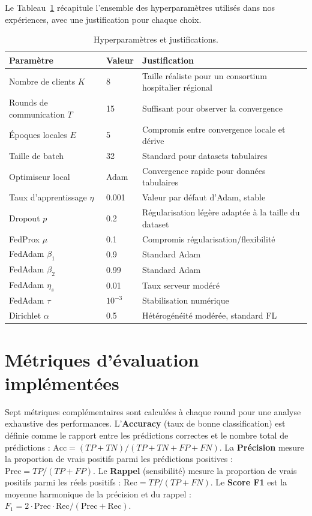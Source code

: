 \documentclass[12pt,a4paper]{report}
\begin{document}
Le Tableau~\ref{tab:hyperparams} r\'{e}capitule l'ensemble des hyperparam\`{e}tres utilis\'{e}s dans nos exp\'{e}riences, avec une justification pour chaque choix.

\begin{table}[H]
\centering
\caption{Hyperparam\`{e}tres et justifications.}
\label{tab:hyperparams}
\begin{tabular}{llp{6cm}}
\toprule
\textbf{Param\`{e}tre} & \textbf{Valeur} & \textbf{Justification} \\
\midrule
Nombre de clients $K$ & 8 & Taille r\'{e}aliste pour un consortium hospitalier r\'{e}gional \\
Rounds de communication $T$ & 15 & Suffisant pour observer la convergence \\
\'{E}poques locales $E$ & 5 & Compromis entre convergence locale et d\'{e}rive \\
Taille de batch & 32 & Standard pour datasets tabulaires \\
Optimiseur local & Adam & Convergence rapide pour donn\'{e}es tabulaires \\
Taux d'apprentissage $\eta$ & 0.001 & Valeur par d\'{e}faut d'Adam, stable \\
Dropout $p$ & 0.2 & R\'{e}gularisation l\'{e}g\`{e}re adapt\'{e}e \`{a} la taille du dataset \\
FedProx $\mu$ & 0.1 & Compromis r\'{e}gularisation/flexibilit\'{e} \\
FedAdam $\beta_1$ & 0.9 & Standard Adam \\
FedAdam $\beta_2$ & 0.99 & Standard Adam \\
FedAdam $\eta_s$ & 0.01 & Taux serveur mod\'{e}r\'{e} \\
FedAdam $\tau$ & $10^{-3}$ & Stabilisation num\'{e}rique \\
Dirichlet $\alpha$ & 0.5 & H\'{e}t\'{e}rog\'{e}n\'{e}it\'{e} mod\'{e}r\'{e}e, standard FL \\
\bottomrule
\end{tabular}
\end{table}

\section{M\'{e}triques d'\'{e}valuation impl\'{e}ment\'{e}es}

Sept m\'{e}triques compl\'{e}mentaires sont calcul\'{e}es \`{a} chaque round pour une analyse exhaustive des performances. L'\textbf{Accuracy} (taux de bonne classification) est d\'{e}finie comme le rapport entre les pr\'{e}dictions correctes et le nombre total de pr\'{e}dictions : $\text{Acc} = (TP + TN) / (TP + TN + FP + FN)$. La \textbf{Pr\'{e}cision} mesure la proportion de vrais positifs parmi les pr\'{e}dictions positives : $\text{Prec} = TP / (TP + FP)$. Le \textbf{Rappel} (sensibilit\'{e}) mesure la proportion de vrais positifs parmi les r\'{e}els positifs : $\text{Rec} = TP / (TP + FN)$. Le \textbf{Score F1} est la moyenne harmonique de la pr\'{e}cision et du rappel : $F_1 = 2 \cdot \text{Prec} \cdot \text{Rec} / (\text{Prec} + \text{Rec})$.
\end{document}
